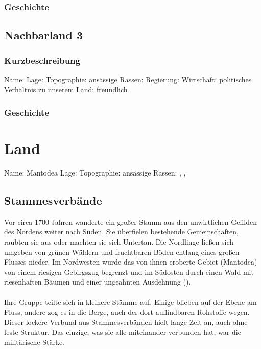 \subsection{Geschichte}

\section{Nachbarland 3}
\subsection{Kurzbeschreibung}
\begin{outline}
	\1 Name: 
	\1 Lage:
	\1 Topographie:
	\1 ansässige Rassen:
	\1 Regierung:
	\1 Wirtschaft:
	\1 politisches Verhältnis zu unserem Land: freundlich
\end{outline}

\subsection{Geschichte}

\chapter{Land}
\begin{outline}
	\1 Name: Mantodea
	\1 Lage: 
	\1 Topographie:
	\1 ansässige Rassen: , , 
\end{outline}
\section{Stammesverbände}
Vor circa 1700 Jahren wanderte ein großer Stamm aus den unwirtlichen Gefilden des Nordens weiter nach Süden.
Sie überfielen bestehende Gemeinschaften, raubten sie aus oder machten sie sich Untertan.
Die Nordlinge ließen sich umgeben von grünen Wäldern und fruchtbaren Böden entlang eines großen Flusses nieder.
Im Nordwesten wurde das von ihnen eroberte Gebiet (Mantodea) von einem riesigen Gebirgszug begrenzt und im Südosten durch einen Wald mit riesenhaften Bäumen und einer ungeahnten Ausdehnung ().\\
\\
Ihre Gruppe teilte sich in kleinere Stämme auf.
Einige blieben auf der Ebene am Fluss, andere zog es in die Berge, auch der dort auffindbaren Rohstoffe wegen.
Dieser lockere Verbund aus Stammesverbänden hielt lange Zeit an, auch ohne feste Struktur.
Das einzige, was sie alle miteinander verbunden hat, war die militärische Stärke.

